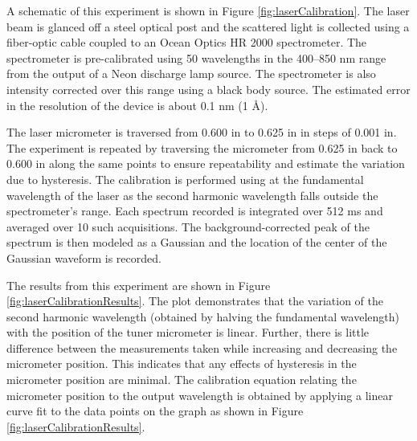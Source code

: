 A schematic of this experiment is shown in Figure \ref{fig:laserCalibration}.
The laser beam is glanced off a steel optical post and the scattered light is collected using a fiber-optic cable coupled to an Ocean Optics HR 2000 spectrometer.
The spectrometer is pre-calibrated using 50 wavelengths in the 400--850 nm range from the output of a Neon discharge lamp source.
The spectrometer is also intensity corrected over this range using a black body source.
The estimated error in the resolution of the device is about 0.1 nm (1 \AA).

The laser micrometer is traversed from 0.600 in to 0.625 in in steps of 0.001 in.
The experiment is repeated by traversing the micrometer from 0.625 in back to 0.600 in along the same points to ensure repeatability and estimate the variation due to hysteresis.
The calibration is performed using at the fundamental wavelength of the laser as the second harmonic wavelength falls outside the spectrometer's range.
Each spectrum recorded is integrated over 512 ms and averaged over 10 such acquisitions.
The background-corrected peak of the spectrum is then modeled as a Gaussian and the location of the center of the Gaussian waveform is recorded.



The results from this experiment are shown in Figure \ref{fig:laserCalibrationResults}.
The plot demonstrates that the variation of the second harmonic wavelength (obtained by halving the fundamental wavelength) with the position of the tuner micrometer is linear.
Further, there is little difference between the measurements taken while increasing and decreasing the micrometer position.
This indicates that any effects of hysteresis in the micrometer position are minimal.
The calibration equation relating the micrometer position to the output wavelength is obtained by applying a linear curve fit to the data points on the graph as shown in Figure \ref{fig:laserCalibrationResults}.


